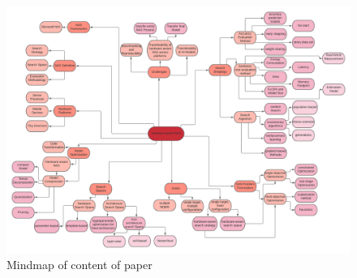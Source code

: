 \documentclass[conference]{IEEEtran}
\begin{document}
\begin{figure}[htbp]
\includegraphics[width=\paperwidth, angle =90]{harware-awareNAS.png}
\caption{Mindmap of content of paper}
\label{fig:Mindmap}
\end{figure} 
\end{document}
